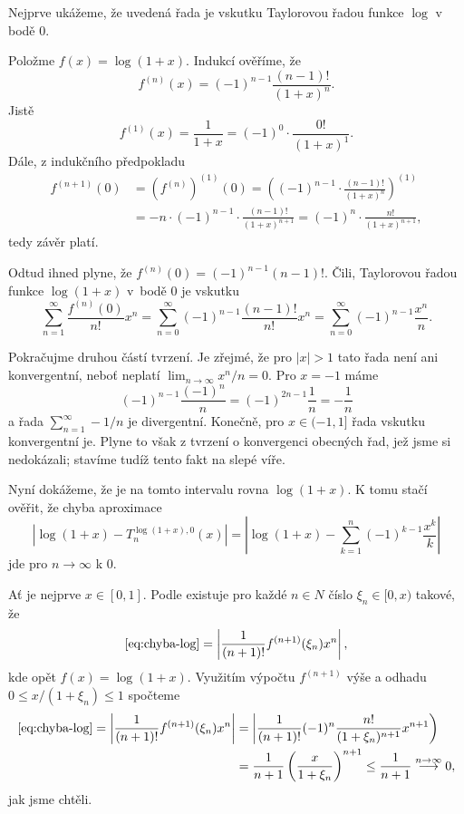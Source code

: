 \begin{thmproof}
 Nejprve ukážeme, že uvedená řada je vskutku Taylorovou řadou funkce $\log$ v
 bodě $0$.

 Položme $f(x) = \log(1+x)$. Indukcí ověříme, že
 \[
  f^{(n)}(x) = (-1)^{n-1}\frac{(n-1)!}{(1 + x)^{n}}.
 \]
 Jistě
 \[
  f^{(1)}(x) = \frac{1}{1 + x} = (-1)^{0} \cdot \frac{0!}{(1+x)^{1}}.
 \]
 Dále, z indukčního předpokladu
 \begin{align*}
  f^{(n+1)}(0) &= (f^{(n)})^{(1)}(0) = \left((-1)^{n-1} \cdot
  \frac{(n-1)!}{(1+x)^{n}}\right)^{(1)}\\ 
               &= -n \cdot (-1)^{n-1} \cdot
               \frac{(n-1)!}{(1+x)^{n+1}} = (-1)^{n} \cdot \frac{n!}{(1+x)^{n+1}},
 \end{align*}
 tedy závěr platí.

 Odtud ihned plyne, že $f^{(n)}(0) = (-1)^{n-1}(n-1)!$. Čili, Taylorovou řadou
 funkce $\log(1+x)$ v~bodě $0$ je vskutku
 \[
  \sum_{n=1}^{\infty} \frac{f^{(n)}(0)}{n!}x^{n} = \sum_{n=0}^{\infty}
  (-1)^{n-1}\frac{(n-1)!}{n!}x^{n} = \sum_{n=0}^{\infty}
  (-1)^{n-1}\frac{x^{n}}{n}.
 \]

 Pokračujme druhou částí tvrzení. Je zřejmé, že pro $|x| > 1$ tato řada není ani
 konvergentní, neboť neplatí $\lim_{n \to \infty} x^{n} / n = 0$. Pro $x = -1$
 máme
 \[
  (-1)^{n-1}\frac{(-1)^{n}}{n} = (-1)^{2n-1}\frac{1}{n} = -\frac{1}{n}
 \]
 a řada $\sum_{n=1}^{\infty} -1 / n$ je divergentní. Konečně, pro $x \in (-1,1]$
 řada vskutku konvergentní je. Plyne to však z tvrzení o konvergenci obecných
 řad, jež jsme si nedokázali; stavíme tudíž tento fakt na slepé víře.

 Nyní dokážeme, že je na tomto intervalu rovna $\log(1+x)$. K tomu stačí ověřit,
 že chyba aproximace
 \begin{equation*}
  \label{eq:chyba-log}
  \tag{$\clubsuit$}
  |\log(1+x) - T^{\log(1+x),0}_n(x)| = \left| \log(1+x) - \sum_{k=1}^n
  (-1)^{k-1}\frac{x^{k}}{k}\right|
 \end{equation*}
 jde pro $n \to \infty$ k $0$.

 Ať je nejprve $x \in [0,1]$. Podle 
 existuje pro každé $n \in N$ číslo $\xi_n \in [0,x)$ takové, že
 \[
  \eqref{eq:chyba-log} = \left| \frac{1}{(n+1)!}f^{(n+1)}(\xi_n)x^{n} \right|,
 \]
 kde opět $f(x) = \log(1 + x)$. Využitím výpočtu $f^{(n+1)}$ výše a odhadu $0
 \leq x / (1 + \xi_n) \leq 1$ spočteme
 \begin{align*}
  \eqref{eq:chyba-log} = \left| \frac{1}{(n+1)!}f^{(n+1)}(\xi_n)x^{n} \right| &=
 \left| \frac{1}{(n+1)!}(-1)^{n}\frac{n!}{(1+\xi_n)^{n+1}}x^{n+1} \right) \\
                                                       &=
  \frac{1}{n+1} \left( \frac{x}{1+\xi_n} \right)^{n+1} \leq \frac{1}{n+1}
  \overset{n \to \infty}{\longrightarrow} 0,
 \end{align*}
 jak jsme chtěli.


\end{thmproof}
